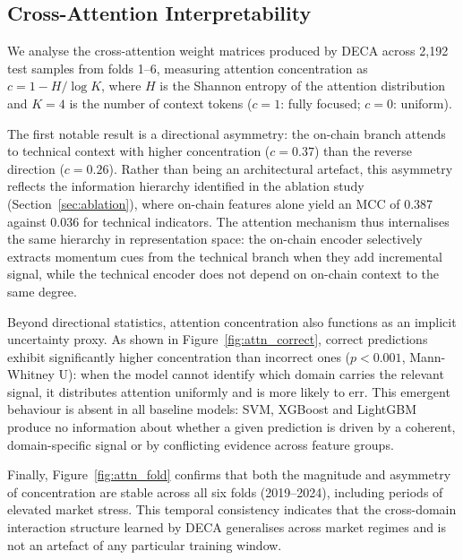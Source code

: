 \documentclass[final,3p,times,authoryear]{elsarticle}
\begin{document}
\subsection{Cross-Attention Interpretability}
\label{sec:attention}

We analyse the cross-attention weight matrices produced by DECA across
2{,}192 test samples from folds 1--6, measuring attention concentration
as $c = 1 - H / \log K$, where $H$ is the Shannon entropy of the
attention distribution and $K=4$ is the number of context tokens
($c=1$: fully focused; $c=0$: uniform).

The first notable result is a directional asymmetry: the on-chain
branch attends to technical context with higher concentration ($c=0.37$)
than the reverse direction ($c=0.26$).
Rather than being an architectural artefact, this asymmetry reflects
the information hierarchy identified in the ablation study
(Section~\ref{sec:ablation}), where on-chain features alone yield an
MCC of 0.387 against 0.036 for technical indicators.
The attention mechanism thus internalises the same hierarchy in
representation space: the on-chain encoder selectively extracts
momentum cues from the technical branch when they add incremental
signal, while the technical encoder does not depend on on-chain context
to the same degree.

Beyond directional statistics, attention concentration also functions
as an implicit uncertainty proxy.
As shown in Figure~\ref{fig:attn_correct}, correct predictions exhibit
significantly higher concentration than incorrect ones ($p < 0.001$,
Mann-Whitney U): when the model cannot identify which domain carries the
relevant signal, it distributes attention uniformly and is more likely
to err.
This emergent behaviour is absent in all baseline models: SVM,
XGBoost and LightGBM produce no information about whether a given
prediction is driven by a coherent, domain-specific signal or by
conflicting evidence across feature groups.

Finally, Figure~\ref{fig:attn_fold} confirms that both the magnitude
and asymmetry of concentration are stable across all six folds
(2019--2024), including periods of elevated market stress.
This temporal consistency indicates that the cross-domain interaction
structure learned by DECA generalises across market regimes and is not
an artefact of any particular training window.
\end{document}
